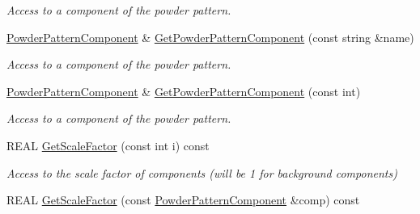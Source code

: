\begin{DoxyCompactItemize}
\begin{DoxyCompactList}\small\item\em Access to a component of the powder pattern. \end{DoxyCompactList}\item 
\mbox{\label{class_obj_cryst_1_1_powder_pattern_a44a54b8333f338ac3029826f5e3a7b68}} 
\mbox{\hyperlink{class_obj_cryst_1_1_powder_pattern_component}{Powder\+Pattern\+Component}} \& \mbox{\hyperlink{class_obj_cryst_1_1_powder_pattern_a44a54b8333f338ac3029826f5e3a7b68}{Get\+Powder\+Pattern\+Component}} (const string \&name)
\begin{DoxyCompactList}\small\item\em Access to a component of the powder pattern. \end{DoxyCompactList}\item 
\mbox{\label{class_obj_cryst_1_1_powder_pattern_a43e3610b833d31fdceb672887495636a}} 
\mbox{\hyperlink{class_obj_cryst_1_1_powder_pattern_component}{Powder\+Pattern\+Component}} \& \mbox{\hyperlink{class_obj_cryst_1_1_powder_pattern_a43e3610b833d31fdceb672887495636a}{Get\+Powder\+Pattern\+Component}} (const int)
\begin{DoxyCompactList}\small\item\em Access to a component of the powder pattern. \end{DoxyCompactList}\item 
\mbox{\label{class_obj_cryst_1_1_powder_pattern_af7ecf858b786986eb8731679615b7a27}} 
R\+E\+AL \mbox{\hyperlink{class_obj_cryst_1_1_powder_pattern_af7ecf858b786986eb8731679615b7a27}{Get\+Scale\+Factor}} (const int i) const
\begin{DoxyCompactList}\small\item\em Access to the scale factor of components (will be 1 for background components) \end{DoxyCompactList}\item 
\mbox{\label{class_obj_cryst_1_1_powder_pattern_ab84a278c497811b1b1b7c5118cc923da}} 
R\+E\+AL \mbox{\hyperlink{class_obj_cryst_1_1_powder_pattern_ab84a278c497811b1b1b7c5118cc923da}{Get\+Scale\+Factor}} (const \mbox{\hyperlink{class_obj_cryst_1_1_powder_pattern_component}{Powder\+Pattern\+Component}} \&comp) const

\end{DoxyCompactItemize}
